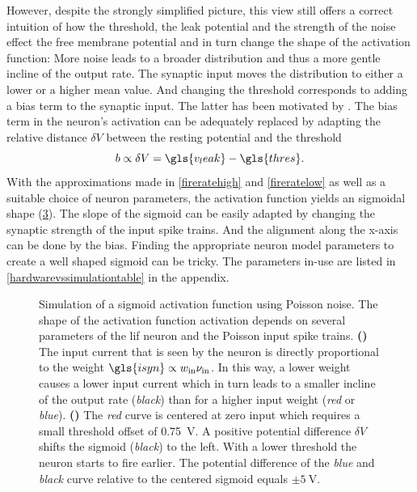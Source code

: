 However, despite the strongly simplified picture, this view still offers a correct intuition of how the threshold, the leak potential and the strength of the noise effect the free membrane potential and in turn change the shape of the activation function: More noise leads to a broader distribution and thus a more gentle incline of the output rate. The synaptic input moves the distribution to either a lower or a higher mean value. And changing the threshold corresponds to adding a bias term to the synaptic input. The latter has been motivated by \cite{petrovici2016stochastic}. The bias term in the neuron's activation can be adequately replaced by adapting the relative distance $\delta V$ between the resting potential and the threshold
\begin{equation}
b \propto \delta V = \gls{v_leak} - \gls{thres}.
\label{biasproptothreseq}
\end{equation}
With the approximations made in \cref{fireratehigh} and \cref{fireratelow} as well as a suitable choice of neuron parameters, the activation function yields an sigmoidal shape (\cref{theoreticalactivationfunction}). The slope of the sigmoid can be easily adapted by changing the synaptic strength of the input spike trains. And the alignment along the x-axis can be done by the bias. Finding the appropriate neuron model parameters to create a well shaped sigmoid can be tricky. The parameters in-use are listed in \cref{hardwarevssimulationtable} in the appendix.

\begin{figure}[h!]
	\begin{subfigure}[c]{0.5\textwidth}
		\centering
		\caption{}
		
		\label{theoreticalactivationfunctionweight}
	\end{subfigure}	
	\begin{subfigure}[c]{0.5\textwidth}
		\centering
		\caption{}
		
		\label{theoreticalactivationfunctionbias}
	\end{subfigure}
	\caption[Simulation of a sigmoid activation function using Poisson noise]{Simulation of a sigmoid activation function using Poisson noise. The shape of the activation function \gls{activation} depends on several parameters of the \gls{lif} neuron and the Poisson input  spike trains. \textbf{()} The input current that is seen by the neuron is directly proportional to the weight $\gls{isyn} \propto w_\text{in} \nu_\text{in}$. In this way, a lower weight causes a lower input current which in turn leads to a smaller incline of the output rate (\emph{black}) than for a higher input weight (\emph{red} or \emph{blue}). \textbf{()} The \emph{red} curve is centered at zero input which requires a small threshold offset of \SI{0.75}{\V}. A positive potential difference $\delta V$ shifts the sigmoid (\emph{black}) to the left. With a lower threshold the neuron starts to fire earlier. The potential difference of the \emph{blue} and \emph{black} curve relative to the centered sigmoid equals $\pm \SI{5}{\V}$.}
	\label{theoreticalactivationfunction}
\end{figure}

